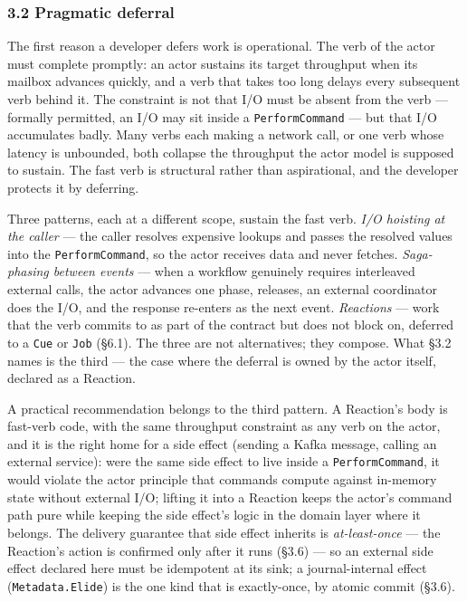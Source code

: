 \documentclass[
]{article}
\let\origtexttt\texttt%
\renewcommand{\texttt}[1]{\origtexttt{\seqsplit{#1}}}%
\let\texttt\origtexttt%
\begin{document}
\subsubsection{3.2 Pragmatic deferral}\label{pragmatic-deferral}

The first reason a developer defers work is operational. The verb of the
actor must complete promptly: an actor sustains its target throughput
when its mailbox advances quickly, and a verb that takes too long delays
every subsequent verb behind it. The constraint is not that I/O must be
absent from the verb --- formally permitted, an I/O may sit inside a
\texttt{PerformCommand} --- but that I/O accumulates badly. Many verbs
each making a network call, or one verb whose latency is unbounded, both
collapse the throughput the actor model is supposed to sustain. The fast
verb is structural rather than aspirational, and the developer protects
it by deferring.

Three patterns, each at a different scope, sustain the fast verb.
\emph{I/O hoisting at the caller} --- the caller resolves expensive
lookups and passes the resolved values into the \texttt{PerformCommand},
so the actor receives data and never fetches. \emph{Saga-phasing between
events} --- when a workflow genuinely requires interleaved external
calls, the actor advances one phase, releases, an external coordinator
does the I/O, and the response re-enters as the next event.
\emph{Reactions} --- work that the verb commits to as part of the
contract but does not block on, deferred to a \texttt{Cue} or
\texttt{Job} (§6.1). The three are not alternatives; they compose. What
§3.2 names is the third --- the case where the deferral is owned by the
actor itself, declared as a Reaction.

A practical recommendation belongs to the third pattern. A Reaction's
body is fast-verb code, with the same throughput constraint as any verb
on the actor, and it is the right home for a side effect (sending a
Kafka message, calling an external service): were the same side effect
to live inside a \texttt{PerformCommand}, it would violate the actor
principle that commands compute against in-memory state without external
I/O; lifting it into a Reaction keeps the actor's command path pure
while keeping the side effect's logic in the domain layer where it
belongs. The delivery guarantee that side effect inherits is
\emph{at-least-once} --- the Reaction's action is confirmed only after
it runs (§3.6) --- so an external side effect declared here must be
idempotent at its sink; a journal-internal effect
(\texttt{Metadata.Elide}) is the one kind that is exactly-once, by
atomic commit (§3.6).
\end{document}
